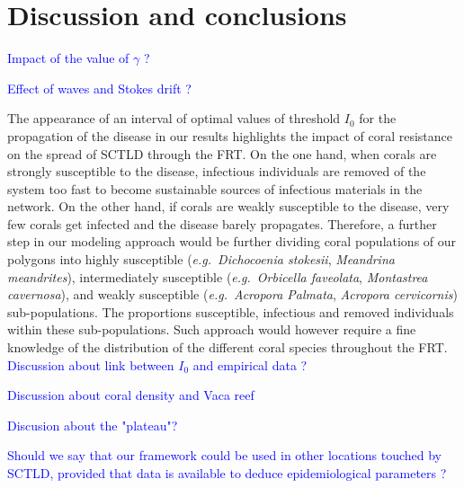 \documentclass[utf8]{frontiersSCNS}
\newcommand{\eg}{{\it e.g.}\ }
\begin{document}

\section{Discussion and conclusions}

\textcolor{blue}{Impact of the value of $\gamma$ ?}

\textcolor{blue}{Effect of waves and Stokes drift ?}

The appearance of an interval of optimal values of threshold $I_0$ for the propagation of the disease in our results highlights the impact of coral resistance on the spread of SCTLD through the FRT. On the one hand, when corals are strongly susceptible to the disease, infectious individuals are removed of the system too fast to become sustainable sources of infectious materials in the network. On the other hand, if corals are weakly susceptible to the disease, very few corals get infected and the disease barely propagates. Therefore, a further step in our modeling approach would be further dividing coral populations of our polygons into highly susceptible (\eg \textit{Dichocoenia stokesii}, \textit{Meandrina meandrites}), intermediately susceptible (\eg \textit{Orbicella faveolata}, \textit{Montastrea cavernosa}), and weakly susceptible (\eg \textit{Acropora Palmata}, \textit{Acropora cervicornis}) sub-populations. The proportions susceptible, infectious and removed individuals within these sub-populations. Such approach would however require a fine knowledge of the distribution of the different coral species throughout the FRT. \textcolor{blue}{Discussion about link between $I_0$ and empirical data ?}

\textcolor{blue}{Discussion about coral density and Vaca reef}

\textcolor{blue}{Discusion about the "plateau"?}

\textcolor{blue}{Should we say that our framework could be used in other locations touched by SCTLD, provided that data is available to deduce epidemiological parameters ?}
\end{document}
